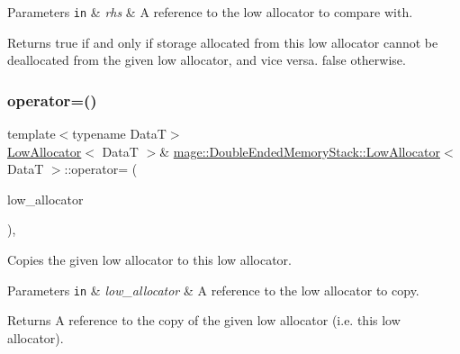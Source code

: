\begin{DoxyParams}[1]{Parameters}
\mbox{\tt in}  & {\em rhs} & A reference to the low allocator to compare with. \\
\hline
\end{DoxyParams}
\begin{DoxyReturn}{Returns}
{\ttfamily true} if and only if storage allocated from this low allocator cannot be deallocated from the given low allocator, and vice versa. {\ttfamily false} otherwise. 
\end{DoxyReturn}
\hypertarget{structmage_1_1_double_ended_memory_stack_1_1_low_allocator_a504e64c7ed51a455635683346a22caf5}{}\label{structmage_1_1_double_ended_memory_stack_1_1_low_allocator_a504e64c7ed51a455635683346a22caf5} 
\subsubsection{\texorpdfstring{operator=()}{operator=()}\hspace{0.1cm}{\footnotesize\ttfamily [1/2]}}
{\footnotesize\ttfamily template$<$typename DataT$>$ \\
\hyperlink{structmage_1_1_double_ended_memory_stack_1_1_low_allocator}{Low\+Allocator}$<$ DataT $>$\& \hyperlink{structmage_1_1_double_ended_memory_stack_1_1_low_allocator}{mage\+::\+Double\+Ended\+Memory\+Stack\+::\+Low\+Allocator}$<$ DataT $>$\+::operator= (\begin{DoxyParamCaption}\item[{const \hyperlink{structmage_1_1_double_ended_memory_stack_1_1_low_allocator}{Low\+Allocator}$<$ DataT $>$ \&}]{low\+\_\+allocator }\end{DoxyParamCaption})\hspace{0.3cm}{\ttfamily [delete]}, {\ttfamily [noexcept]}}

Copies the given low allocator to this low allocator.


\begin{DoxyParams}[1]{Parameters}
\mbox{\tt in}  & {\em low\+\_\+allocator} & A reference to the low allocator to copy. \\
\hline
\end{DoxyParams}
\begin{DoxyReturn}{Returns}
A reference to the copy of the given low allocator (i.\+e. this low allocator). 
\end{DoxyReturn}
\hypertarget{structmage_1_1_double_ended_memory_stack_1_1_low_allocator_a41074a252b7ebdd542d4dd597c4ff172}{}\label{structmage_1_1_double_ended_memory_stack_1_1_low_allocator_a41074a252b7ebdd542d4dd597c4ff172} 
